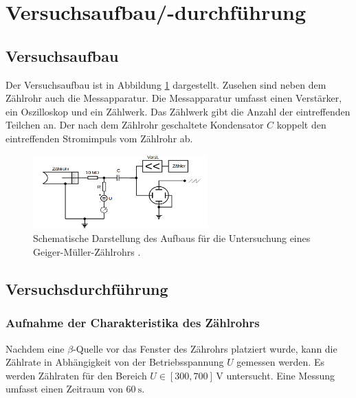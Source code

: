 \section{Versuchsaufbau/-durchführung}

\subsection{Versuchsaufbau}
Der Versuchsaufbau ist in Abbildung \ref{fig: versuchsaufabu} dargestellt.
Zusehen sind neben dem Zählrohr auch die Messapparatur.   %
Die Messapparatur umfasst einen Verstärker, ein Oszilloskop und
ein Zählwerk. Das Zählwerk gibt die Anzahl der eintreffenden Teilchen
an. Der nach dem Zählrohr geschaltete Kondensator $C$ koppelt den eintreffenden
Stromimpuls vom Zählrohr ab.
\begin{figure}
  \centering
  \includegraphics[width=0.6\textwidth]{bilder/aufbau.png}
  \caption{Schematische Darstellung des Aufbaus für die Untersuchung eines Geiger-Müller-Zählrohrs \cite{anleitung703}.}
  \label{fig: versuchsaufabu}
  \end{figure}
\subsection{Versuchsdurchführung}

\subsubsection{Aufnahme der Charakteristika des Zählrohrs} %

Nachdem eine $\beta$-Quelle vor das Fenster des Zährohrs platziert wurde,
kann die Zählrate in Abhängigkeit von der Betriebsspannung $U$ gemessen werden.
Es werden Zählraten für den Bereich $U\in\left[300, 700\right] \, \si{\volt}$
untersucht. Eine Messung umfasst einen Zeitraum von $\SI{60}{\second}$.


